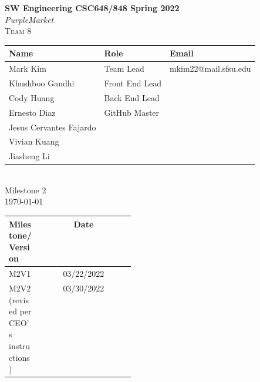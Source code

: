 \begin{titlepage}
\begin{center}
	\vspace*{1cm}
	\LARGE
	\textbf{SW Engineering CSC648/848 Spring 2022}\\
	\textit{PurpleMarket}\\
	\textsc{Team 8}\\
	\vspace{5mm}
	\normalsize
	\begin{tabular}{ | l | l | l | }
	\hline
	Name & Role & Email\\\hline
	Mark Kim & Team Lead & mkim22@mail.sfsu.edu\\
	Khushboo Gandhi & Front End Lead &\\
	Cody Huang & Back End Lead &\\
	Ernesto Diaz & GitHub Master &\\
	Jesus Cervantes Fajardo & &\\
	Vivian Kuang & &\\
	Jiasheng Li & &\\\hline
	\end{tabular}
	\large\\
	\vspace{5mm}
	Milestone 2\\
	\today\\
	\vspace{1cm}
	\begin{tabular}{ | p{0.25\linewidth} | c | }
		\hline
		\textbf{Milestone/Version} & \textbf{Date}\\
		\hline
		M2V1 & 03/22/2022\\
		M2V2 (revised per CEO's instructions) & 03/30/2022\\
		\hline
	\end{tabular}

\end{center}
\end{titlepage}